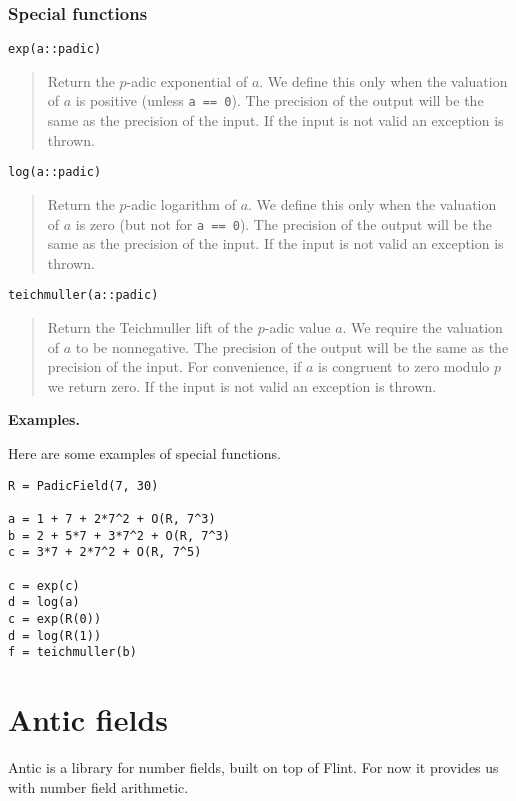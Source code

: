 \documentclass[a4paper,10pt]{article}
\newcommand{\code}{\lstinline}
\newcommand{\desc}[1]{\vspace{-3mm}\begin{quote}#1\end{quote}}
\begin{document}
{{\subsubsection{Special functions}

\begin{lstlisting}
exp(a::padic)
\end{lstlisting}

\desc{Return the $p$-adic exponential of $a$. We define this only when the
valuation of $a$ is positive (unless \code{a == 0}). The precision of the
output will be the same as the precision of the input. If the input is not
valid an exception is thrown.}

\begin{lstlisting}
log(a::padic)
\end{lstlisting}

\desc{Return the $p$-adic logarithm of $a$. We define this only when the
valuation of $a$ is zero (but not for \code{a == 0}). The precision of the
output will be the same as the precision of the input. If the input is not
valid an exception is thrown.}

\begin{lstlisting}
teichmuller(a::padic)
\end{lstlisting}

\desc{Return the Teichmuller lift of the $p$-adic value $a$. We require the
valuation of $a$ to be nonnegative. The precision of the output will be the
same as the precision of the input. For convenience, if $a$ is congruent to
zero modulo $p$ we return zero. If the input is not valid an exception is
thrown.}

\textbf{Examples.}

Here are some examples of special functions.

\begin{lstlisting}
R = PadicField(7, 30)

a = 1 + 7 + 2*7^2 + O(R, 7^3)
b = 2 + 5*7 + 3*7^2 + O(R, 7^3)
c = 3*7 + 2*7^2 + O(R, 7^5)

c = exp(c)
d = log(a)
c = exp(R(0))
d = log(R(1))
f = teichmuller(b) 
\end{lstlisting}

\section{Antic fields}

Antic is a library for number fields, built on top of Flint. For now it provides us
with number field arithmetic.

}}
\end{document}
